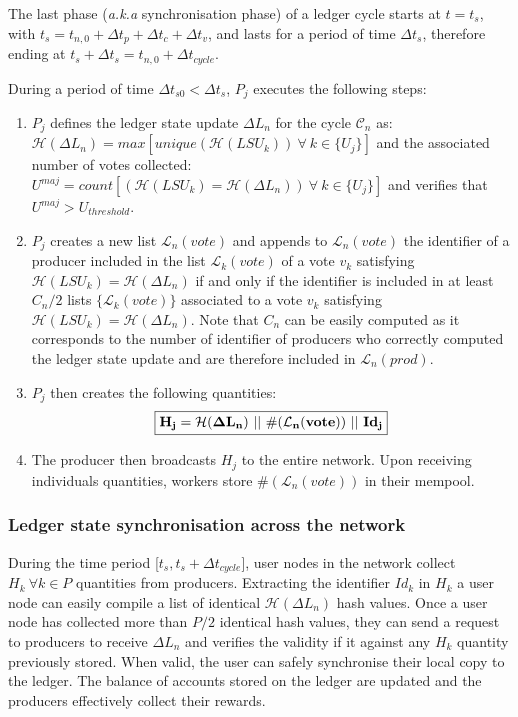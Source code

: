 The last phase (\textit{a.k.a} synchronisation phase) of a ledger cycle starts at $t = t_s$, with $t_s = t_{n,0} + \Delta t_{p} + \Delta t_{c}+ \Delta t_{v}$, and lasts for a period of time $\Delta t_{s}$, therefore ending at $t_s+\Delta t_s = t_{n,0}  + \Delta t_{cycle}$.

During a period of time $\Delta t_{s0} < \Delta t_{s}$, $P_j$ executes the following steps:

\begin{enumerate}
\item $P_j$ defines the ledger state update $\Delta L_n$ for the cycle $\mathcal{C}_n$ as:\\
 $\mathcal{H}(\Delta L_n)  = max[unique(\mathcal{H}(LSU_k))~\forall~k\in\{U_j\}]$ and the associated number of votes collected: $U^{maj} = count[(\mathcal{H}(LSU_k) = \mathcal{H}(\Delta L_n))~\forall~k\in\{U_j\}]$ and verifies that $U^{maj}> U_{threshold}$.
\item $P_j$ creates a new list $\mathcal{L}_{n}(vote)$ and appends to $\mathcal{L}_{n}(vote)$ the identifier of a producer included in the list $\mathcal{L}_{k}(vote)$ of a vote $v_k$ satisfying $\mathcal{H}(LSU_k) = \mathcal{H}(\Delta L_n)$ if and only if the identifier is included in at least $C_n/2$ lists $\{\mathcal{L}_{k}(vote)\}$ associated to a vote $v_{k}$ satisfying $\mathcal{H}(LSU_k) = \mathcal{H}(\Delta L_n)$. Note that $C_n$ can be easily computed as it corresponds to the number of identifier of producers who correctly computed the ledger state update and are therefore included in $\mathcal{L}_{n}(prod)$.
\item $P_j$ then creates the following quantities:
\begin{equation}
\label{eq:Hj}
\fbox{$\mathbf{H_{j} = \mathcal{H}(\Delta L_n)~||~\#(\mathcal{L}_{n}(vote))~||~Id_j}$}
\end{equation}
\item The producer then broadcasts $H_j$ to the entire network. Upon receiving individuals quantities, workers store $\#(\mathcal{L}_{n}(vote))$ in their mempool. 
\end{enumerate}


\subsubsection{Ledger state synchronisation across the network}

During the time period [$t_{s}, t_s + \Delta t_{cycle}$], user nodes in the network collect $H_k~\forall k \in P$ quantities from producers. Extracting the identifier $Id_k$ in $H_k$ a user node can easily compile a list of identical $\mathcal{H}(\Delta L_n)$ hash values. Once a user node has collected more than $P/2$ identical hash values, they can send a request to producers to receive $\Delta L_n$ and verifies the validity if it against any $H_k$ quantity previously stored. When valid, the user can safely synchronise their local copy to the ledger. The balance of accounts stored on the ledger are updated and the producers effectively collect their rewards. \\

